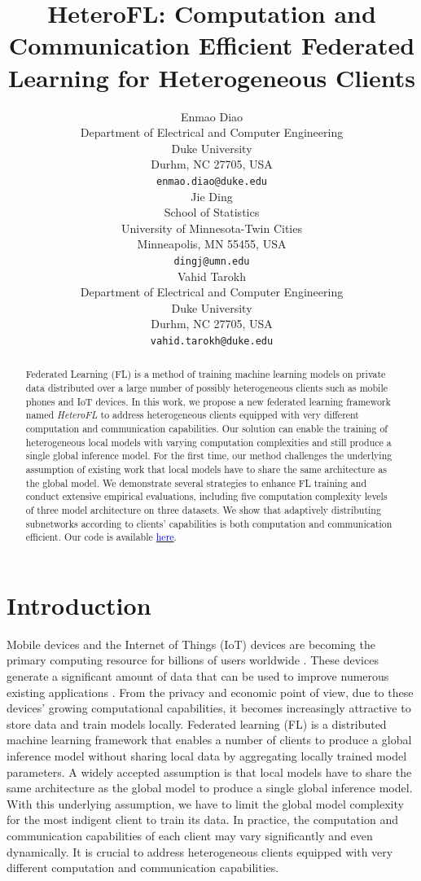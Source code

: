 \documentclass{article} %
\title{HeteroFL: Computation and Communication Efficient Federated Learning for Heterogeneous Clients}
\author{Enmao Diao \\
Department of Electrical and Computer Engineering\\
Duke University\\
Durhm, NC 27705, USA \\
\texttt{enmao.diao@duke.edu} \\
\And
Jie Ding \\
School of Statistics \\
University of Minnesota-Twin Cities \\
Minneapolis, MN 55455, USA\\
\texttt{dingj@umn.edu} \\
\AND
Vahid Tarokh \\
Department of Electrical and Computer Engineering\\
Duke University\\
Durhm, NC 27705, USA \\
\texttt{vahid.tarokh@duke.edu}
}
\begin{document}
\maketitle

\begin{abstract}
Federated Learning (FL) is a method of training machine learning models on private data distributed over a large number of possibly heterogeneous clients such as mobile phones and IoT devices. In this work, we propose a new federated learning framework named \textit{HeteroFL} to address heterogeneous clients equipped with very different computation and communication capabilities. Our solution can enable the training of heterogeneous local models with varying computation complexities and still produce a single global inference model. For the first time, our method challenges the underlying assumption of existing work that local models have to share the same architecture as the global model. We demonstrate several strategies to enhance FL training and conduct extensive empirical evaluations, including five computation complexity levels of three model architecture on three datasets. We show that adaptively distributing subnetworks according to clients' capabilities is both computation and communication efficient. Our code is available \href{https://github.com/dem123456789/HeteroFL-Computation-and-Communication-Efficient-Federated-Learning-for-Heterogeneous-Clients}{\textcolor{blue}{here}}.

\end{abstract}

\section{Introduction}
Mobile devices and the Internet of Things (IoT) devices are becoming the primary computing resource for billions of users worldwide \citep{lim2020federated}. These devices generate a significant amount of data that can be used to improve numerous existing applications \citep{hard2018federated}. From the privacy and economic point of view, due to these devices' growing computational capabilities, it becomes increasingly attractive to store data and train models locally. Federated learning (FL) \citep{konevcny2016federated, mcmahan2017communication} is a distributed machine learning framework that enables a number of clients to produce a global inference model without sharing local data by aggregating locally trained model parameters. A widely accepted assumption is that local models have to share the same architecture as the global model \citep{li2020federated} to produce a single global inference model. With this underlying assumption, we have to limit the global model complexity for the most indigent client to train its data. In practice, the computation and communication capabilities of each client may vary significantly and even dynamically. It is crucial to address heterogeneous clients equipped with very different computation and communication capabilities.
\end{document}
